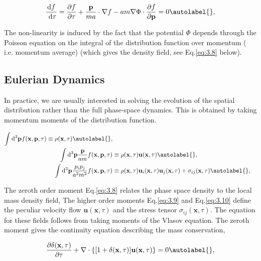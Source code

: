 \begin{equation}
    \frac{\mathrm{d} f}{\mathrm{~d} \tau}=\frac{\partial f}{\partial \tau}+\frac{\mathbf{p}}{m a} \cdot \nabla f-a m \nabla \Phi \cdot \frac{\partial f}{\partial \mathbf{p}}=0 \autolabel{},
\end{equation}

The non-linearity is induced by the fact that the potential $\Phi$ depends through the Poisson equation on the integral of the distribution function over momentum ( i.e. momentum average) (which gives the density field, see Eq.\eqref{eq:3.8} below).


\subsection{Eulerian Dynamics}
In practice, we are usually interested in solving the evolution of the spatial distribution rather than the full phase-space dynamics. This is obtained by taking momentum moments of the distribution function. 


\begin{align}
    \int \mathrm{d}^{3} \mathbf{p} f(\mathbf{x}, \mathbf{p}, \tau) \equiv \rho(\mathbf{x}, \tau) \autolabel{},\\
    \int \mathrm{d}^{3} \mathbf{p} \frac{\mathbf{p}}{a m} f(\mathbf{x}, \mathbf{p}, \tau) & \equiv \rho(\mathbf{x}, \tau) \mathbf{u}(\mathbf{x}, \tau)  \autolabel{},\\
    \int \mathrm{d}^{3} \mathbf{p} \frac{p_{i} p_{j}}{a^{2} m^{2}} f(\mathbf{x}, \mathbf{p}, \tau) & \equiv \rho(\mathbf{x}, \tau) \mathbf{u}_{i}(\mathbf{x}, \tau) \mathbf{u}_{j}(\mathbf{x}, \tau)+\sigma_{i j}(\mathbf{x}, \tau) \autolabel{},
\end{align}


The zeroth order moment Eq.\eqref{eq:3.8} relates the phase space density to the local mass density field, The higher order moments Eq.\eqref{eq:3.9} and Eq.\eqref{eq:3.10} define the peculiar velocity flow $\mathbf{u}(\mathbf{x}, \tau)$ and the stress tensor $\sigma_{i j}(\mathbf{x}, \tau)$. The equation for these fields follows from taking moments of the Vlasov equation. The zeroth moment gives the continuity equation describing the  mass conservation,


\begin{equation}
    \frac{\partial \delta(\mathbf{x}, \tau)}{\partial \tau}+\nabla \cdot\{[1+\delta(\mathbf{x}, \tau)] \mathbf{u}(\mathbf{x}, \tau)\}=0 \autolabel{},
\end{equation}

